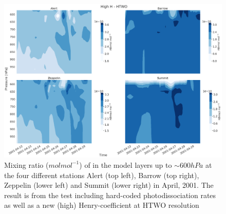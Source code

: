 \begin{figure}[h]
    \centering
    \includegraphics[width=\linewidth]{Chapter6_Results/images/vertHBr_HTWO_step3.png}
    \caption{Mixing ratio ($mol mol^{-1}$) of  in the model layers up to $\sim 600 hPa$ at the four different stations Alert (top left), Barrow (top right), Zeppelin (lower left) and Summit (lower right) in April, 2001. The result is from the test including hard-coded photodissociation rates as well as a new (high) Henry-coefficient at HTWO resolution}
    \label{fig:vertHBr_HTWO_step3}
\end{figure}